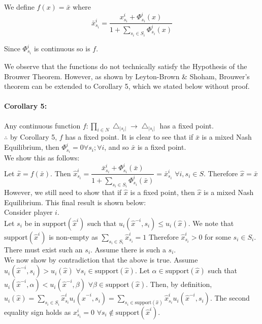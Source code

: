 \documentclass[12pt]{article}
\begin{document}
We define $f(x) = \bar{x}$ where 
\begin{equation*}
\bar{x}^i_{s_i} = \dfrac{x^i_{s_i} +  \Phi^i_{s_i}(x)}{1 + \sum\limits_{s_i \in S_i}  \Phi^i_{s_i}(x)}
\end{equation*}

Since $ \Phi^i_{s_i}$ is continuous so is $f$.

We observe that the functions do not technically satisfy the Hypothesis of the Brouwer Theorem. However, as shown by Leyton-Brown \& Shoham, Brouwer's theorem can be extended to Corollary 5, which we stated below without proof.


\paragraph{Corollary 5:} Any continuous function $f: \prod\limits_{i \in N} \bigtriangleup_{|s_i|} \longrightarrow \bigtriangleup_{|s_i|}$ has a fixed point.\\

$\therefore$ by Corollary 5, $f$ has a fixed point. It is clear to see that if $\bar{x}$ is a mixed Nash Equilibrium, then $\Phi^i_{s_i} = 0 \forall s_i; \forall i$, and so $\bar{x}$ is a fixed point.\\

We show this as follows:\\

Let $\hat{x} = f(\bar{x})$. Then $\hat{x}^i_{s_i} = \dfrac{\bar{x}^i_{s_i} + \Phi^i_{s_i}(\bar{x})}{1 + \sum\limits_{s_i \in S_i}\Phi^i_{s_i} (\bar{x})} = \bar{x}^i_{s_i}$ $\forall i, s_i \in S$. Therefore $\hat{x} = \bar{x}$\\

However, we still need to show that if $\hat{x}$ is a fixed point, then $\hat{x}$ is a mixed Nash Equilibrium. This final result is shown below:\\

Consider player $i$.\\

Let $s_i$ be in $\text{support}(\hat{x}^i)$ such that $u_i(\hat{x}^{-i}, s_i) \leq u_i(\hat{x})$. We note that $\text{support}(\hat{x}^i)$ is non-empty as $\sum\limits_{s_i \in S_i} \hat{x}^i_{s_i} = 1$ Therefore $\hat{x}^i_{s_i} > 0$ for some $s_i \in S_i$.
There must exist such an $s_i$. Assume there is such a $s_i$.\\

We now show by contradiction that the above is true. Assume $u_i(\hat{x}^{-i}, s_i) > u_i(\hat{x})$ $\forall s_i \in \text{support}(\hat{x})$. Let $\alpha \in \text{support}(\hat{x})$ such that $u_i(\hat{x}^{-i}, \alpha) < u_i(\hat{x}^{-i}, \beta)$ $\forall \beta \in \text{support}(\hat{x})$. Then, by definition, $u_i(\hat{x}) = \sum\limits_{s_i \in S_i} \hat{x}^i_{s_i} u_i(\hat{x}^{-i},s_i) = \sum\limits_{s_i \in \text{support}(\hat{x})} \hat{x}^i_{s_i} u_i(\hat{x}^{-i},s_i)$. The second equality sign holds as $x^i_{s_i} = 0$ $\forall  s_i \notin \text{support}(\hat{x}^i)$.
\end{document}
